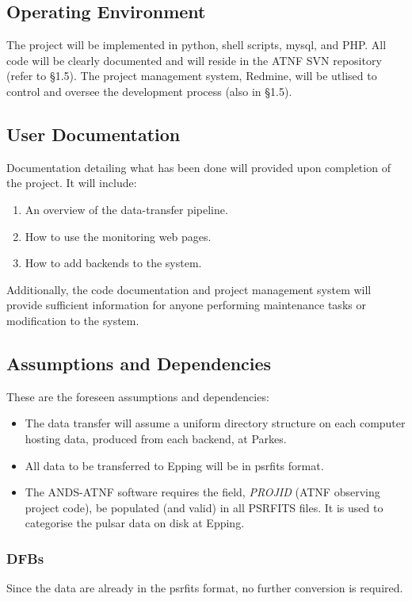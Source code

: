 \documentclass[a4paper,11pt]{article}
\begin{document}
\subsection{Operating Environment}
The project will be implemented in python, shell scripts, mysql, and PHP. All code will be clearly documented and will reside in the ATNF SVN repository (refer to \S 1.5). The project management system, Redmine, will be utlised to control and oversee the development process (also in \S 1.5).

\subsection{User Documentation}
Documentation detailing what has been done will provided upon completion of the project. It will include:
\begin{enumerate}
\item An overview of the data-transfer pipeline.
\item How to use the monitoring web pages.
\item How to add backends to the system.
\end{enumerate}

Additionally, the code documentation and project management system will provide sufficient information for anyone performing maintenance tasks or modification to the system.

\subsection{Assumptions and Dependencies}
These are the foreseen assumptions and dependencies:

\begin{itemize}
\item The data transfer will assume a uniform directory structure on each computer hosting data, produced from each backend, at Parkes. 
\item All data to be transferred to Epping will be in psrfits format.
\item The ANDS-ATNF software requires the field, \emph{PROJID} (ATNF observing project code), be populated (and valid) in all PSRFITS files. It is used to categorise the pulsar data on disk at Epping.
\end{itemize}

\subsubsection{DFBs}
Since the data are already in the psrfits format, no further conversion is required.
\end{document}

